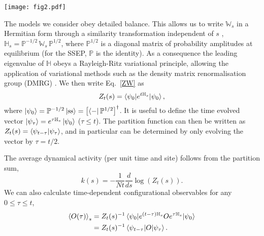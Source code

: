 \documentclass[prl,showpacs,superscriptaddress,twocolumn,longbibliography]{revtex4-1}
\newcommand{\er}[1]{Eq.~\eqref{#1}}
\newcommand{\beq}{\begin{equation}}
\newcommand{\eeq}{\end{equation}}
\begin{document}
\begin{figure*}[t]
    \centering
    \texttt{[image: fig2.pdf]}
    \caption{\textbf{Rare event statistics.} 
    The rare event statistics for the East model with $c = 0.5$ (top) and the FA model with $c = 0.2$ (middle) and SSEP (bottom).
    (a) The dynamical activity $k(s, t)$ as a function of $s$ and inverse time $1/t$ for $N = 100$. The red dotted line indicates our estimate of the critical point.
    (b) The critical point for various system sizes $N\in[10, 200]$. The dotted lines indicate the infinite time value (see Refs.~\cite{Banuls2019, Causer2020}), and the dashed line shows $s_{c}(N, t) \sim t^{-1}$.
    (c) The same data is shown in (b) but with $s_{c}(N, t)$ scaled by $s_{c}(N)$ and time scaled by $N^{-\alpha}$, where $\alpha$ is the critical exponent extracted from $s_{c}(N)$. The dotted line shows where the y-axis is one, and the dashed line shows $t^{-\beta}$. The sum of both lines is given by the dashed-dotted line.
    (d) The estimate of the rate function $\Phi_{t}(k)$ defined in \er{rate}. The dashed line shows a Poisson distribution with the equilibrium average as its mean.
    }
    \label{fig: scaling}
\end{figure*}


\smallskip
{}
The models we consider obey detailed balance. This allows us to write $\mathbb{W}_{s}$ in a Hermitian form through a similarity transformation independent of $s$ \cite{Garrahan2009}, $\mathbb{H}_{s} = \mathbb{P}^{-1/2}\,\mathbb{W}_{s}\,\mathbb{P}^{1/2}$, where $\mathbb{P}^{1/2}$ is a diagonal matrix of probability amplitudes at equilibrium (for the SSEP, $\mathbb{P}$ is the identity). As a consequence the leading eigenvalue of $\mathbb{H}$ obeys a Rayleigh-Ritz variational principle, {allowing the application of variational methods} such as the density matrix renormalisation group (DMRG) \cite{White1992}. We then write \er{ZW} as
\beq
    Z_{t}(s) = \braket{\psi_{0} | e^{t\mathbb{H}_{s}} | {\rm \psi_{0}}},
    \label{ZH}
\eeq
where $\ket{\psi_{0}} = \mathbb{P}^{-1/2}\ket{{\rm ss}} = \left[\bra{-} \mathbb{P}^{1/2}\right]^{\dag}$.
It is useful to define the time evolved vector $\ket{\psi_{\tau}} = e^{\tau\mathbb{H}_{s}}\ket{\psi_{0}}$ ($\tau \leq t$).
The partition function can then be written as $Z_{t}(s) = \braket{\psi_{t-\tau} | \psi_{\tau}}$, and in particular can be determined by only evolving the vector by $\tau = t / 2$.

The average dynamical activity (per unit time and site) follows from the partition sum,
\beq
    k(s) = -\frac{1}{Nt}\frac{d}{ds} \log(Z_{t}(s)).
    \label{k}
\eeq
We can also calculate time-dependent configurational observables for any $0 \leq \tau \leq t$,
\begin{align}
    \braket{O(\tau)}_{s} &= Z_{t}(s)^{-1} \braket{\psi_{0} | e^{(t-\tau)\mathbb{H}_{s}} O e^{\tau\mathbb{H}_{s}} | \psi_{0}}
    \nonumber
    \\
    &= Z_{t}(s)^{-1} \braket{ \psi_{t-\tau}| O | \psi_{\tau}}.
    \label{O}
\end{align}
\end{document}
